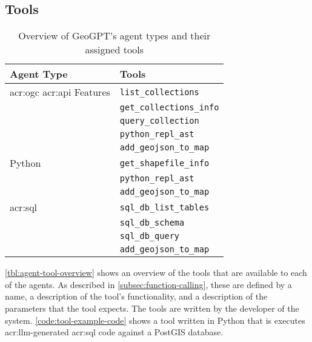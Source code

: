 \subsection{Tools}
\label{subsec:tools}

\begin{table}[h]
    \centering
    \caption{Overview of GeoGPT's agent types and their assigned tools}
    \label{tbl:agent-tool-overview}
    \begin{tabularx}{0.7\textwidth}{XX}
        \toprule
        \textbf{Agent Type}                            & \textbf{Tools}                  \\
        \midrule
        \acrshort{acr:ogc} \acrshort{acr:api} Features & \texttt{list\_collections}      \\
                                                       & \texttt{get\_collections\_info} \\
                                                       & \texttt{query\_collection}      \\
                                                       & \texttt{python\_repl\_ast}      \\
                                                       & \texttt{add\_geojson\_to\_map}  \\
        \midrule
        Python                                         & \texttt{get\_shapefile\_info}   \\
                                                       & \texttt{python\_repl\_ast}      \\
                                                       & \texttt{add\_geojson\_to\_map}  \\
        \midrule
        \acrshort{acr:sql}                             & \texttt{sql\_db\_list\_tables}  \\
                                                       & \texttt{sql\_db\_schema}        \\
                                                       & \texttt{sql\_db\_query}         \\
                                                       & \texttt{add\_geojson\_to\_map}  \\
        \bottomrule
    \end{tabularx}
\end{table}

\autoref{tbl:agent-tool-overview} shows an overview of the tools that are available to each of the agents. As described in \autoref{subsec:function-calling}, these are defined by a name, a description of the tool's functionality, and a description of the parameters that the tool expects. The tools are written by the developer of the system. \autoref{code:tool-example-code} shows a tool written in Python that is executes \acrshort{acr:llm}-generated \acrshort{acr:sql} code against a PostGIS database.

